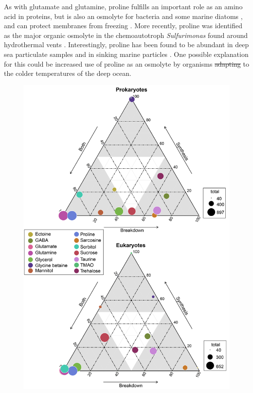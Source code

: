 \documentclass[utf8]{frontiersSCNS} %
\providecommand{\DIFaddtex}[1]{{\protect\color{blue}\uwave{#1}}} %
\providecommand{\DIFdeltex}[1]{{\protect\color{red}\sout{#1}}}                      %
\providecommand{\DIFaddbegin}{} %
\providecommand{\DIFaddend}{} %
\providecommand{\DIFdelbegin}{} %
\providecommand{\DIFdelend}{} %
\providecommand{\DIFaddbeginFL}{} %
\providecommand{\DIFdelbeginFL}{} %
\providecommand{\DIFdelendFL}{} %
\providecommand{\DIFadd}[1]{\texorpdfstring{\DIFaddtex{#1}}{#1}} %
\providecommand{\DIFdel}[1]{\texorpdfstring{\DIFdeltex{#1}}{}} %
\begin{document}
As with glutamate and glutamine, proline fulfills an important role as an amino acid in proteins, but is also an osmolyte for bacteria \citep{Burg2008,Brill2011} and some marine diatoms \citep{Dawson2020,Dawson2020.2}, and can protect membranes from freezing \citep{Yancey2005}. More recently, proline was identified as the major organic osmolyte in the chemoautotroph \emph{Sulfurimonas} found around hydrothermal vents \citep{Gotz2018}. Interestingly, proline has been found to be abundant in deep sea particulate samples \citep{Takasu2015,Johnson2021} and in sinking marine particles \citep{Johnson2020}. One possible explanation for this could be increased use of proline as an osmolyte by organisms \DIFdelbegin \DIFdel{adapting }\DIFdelend \DIFaddbegin \DIFadd{adapted }\DIFaddend to the colder temperatures of the deep ocean.
\begin{figure}[t!]
    \centering
    \DIFdelbeginFL %
\DIFdelendFL \DIFaddbeginFL \includegraphics[width = 0.6\columnwidth]{Figures/ProkEukOverlapBW.png}

\end{figure}
\end{document}
